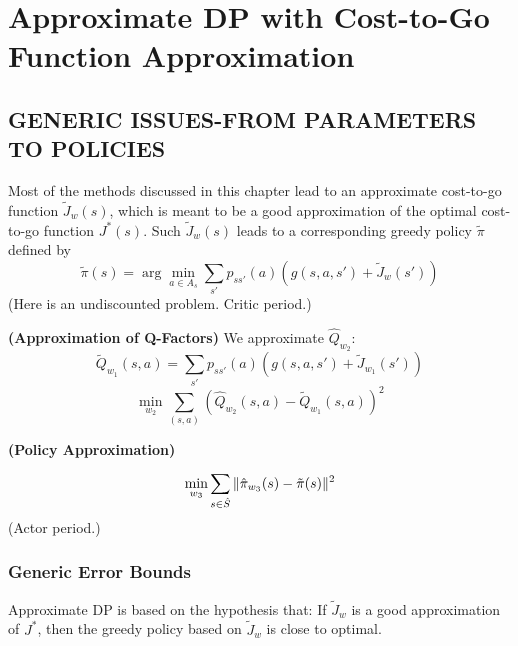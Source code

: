 
\section{Approximate DP with Cost-to-Go Function Approximation}%
\label{sec:approximate_dp_with_cost_to_go_function_approximation}

\subsection{GENERIC ISSUES-FROM PARAMETERS TO POLICIES}%
\label{sub:generic_issues_from_parameters_to_policies}

Most of the methods discussed in this chapter lead to an approximate cost-to-go function $ \tilde J_{w}(s) $, which is meant to be a good approximation of the optimal cost-to-go function $ J^*(s) $.
Such $ \tilde J_w(s) $ leads to a corresponding greedy policy $ \tilde\pi $ defined by
\[
    \tilde\pi(s) = \arg\min_{a \in A_s} \sum^{}_{s'} p_{ss'}(a)(g(s, a, s') + \tilde J_{w}(s'))
\]
(Here is an undiscounted problem. Critic period.)

\textbf{(Approximation of Q-Factors)}
We approximate $ \hat Q_{w_2} $:
\[
    \tilde Q_{w_1}(s, a) = \sum^{}_{s'} p_{ss'}(a) (g(s, a, s') + \tilde J_{w_1}(s'))
\]
\[
    \min_{w_2} \sum^{}_{(s, a)} {(\hat Q_{w_2}(s, a) - \tilde Q_{w_1}(s,a))}^2
\]

\textbf{(Policy Approximation)}
\[
    \min_{w_3} \sum^{}_{s \in \hat S} \Arrowvert \hat \pi_{w_3}(s) - \tilde \pi(s) \Arrowvert^2
\]
(Actor period.)

\subsubsection{Generic Error Bounds}%

Approximate DP is based on the hypothesis that:
If $ \tilde J_{w} $ is a good approximation of $ J^* $, then the greedy policy based on $ \tilde J_{w} $ is close to optimal.

